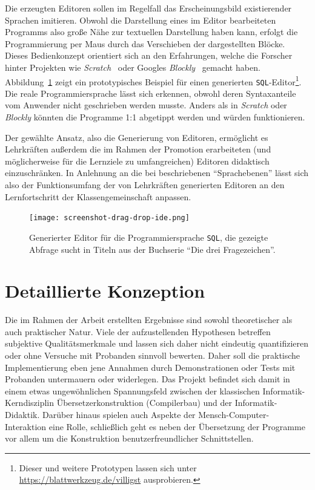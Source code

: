 \documentclass[paper=a4,fontsize=11pt,parskip=half]{scrartcl}
\begin{document}
Die erzeugten Editoren sollen im Regelfall das Erscheinungsbild existierender Sprachen imitieren. Obwohl die Darstellung eines im Editor bearbeiteten Programms also große Nähe zur textuellen Darstellung haben kann, erfolgt die Programmierung per Maus durch das Verschieben der dargestellten Blöcke. Dieses Bedienkonzept orientiert sich an den Erfahrungen, welche die Forscher hinter Projekten wie \textit{Scratch}~\cite{maloney_scratch:_2004} oder Googles \textit{Blockly}~\cite{fraser_ten_2015} gemacht haben. Abbildung~\ref{fig:example-sql-ide} zeigt ein prototypisches Beispiel für einen generierten \texttt{SQL}-Editor\footnote{Dieser und weitere Prototypen lassen sich unter \url{https://blattwerkzeug.de/villigst} ausprobieren.}. Die reale Programmiersprache lässt sich erkennen, obwohl deren Syntaxanteile vom Anwender nicht geschrieben werden musste. Anders als in \textit{Scratch} oder \textit{Blockly} könnten die Programme 1:1 abgetippt werden und würden funktionieren.

Der gewählte Ansatz, also die Generierung von Editoren, ermöglicht es Lehrkräften außerdem die im Rahmen der Promotion erarbeiteten (und möglicherweise für die Lernziele zu umfangreichen) Editoren didaktisch einzuschränken. In Anlehnung an die bei \cite{klaeren_macht_2007} beschriebenen \enquote{Sprachebenen} lässt sich also der Funktionsumfang der von Lehrkräften generierten Editoren an den Lernfortschritt der Klassengemeinschaft anpassen.

\begin{figure}[h]
  \centering\texttt{[image: screenshot-drag-drop-ide.png]}
  \caption{Generierter Editor für die Programmiersprache \texttt{SQL}, die gezeigte Abfrage sucht in Titeln aus der Buchserie \enquote{Die drei Fragezeichen}.}
  \label{fig:example-sql-ide}
\end{figure}

\clearpage

\restoregeometry
\pagestyle{plain}

\section{Detaillierte Konzeption}

Die im Rahmen der Arbeit erstellten Ergebnisse sind sowohl theoretischer als auch praktischer Natur. Viele der aufzustellenden Hypothesen betreffen subjektive Qualitätsmerkmale und lassen sich daher nicht eindeutig quantifizieren oder ohne Versuche mit Probanden sinnvoll bewerten. Daher soll die praktische Implementierung eben jene Annahmen durch Demonstrationen oder Tests mit Probanden untermauern oder widerlegen. Das Projekt befindet sich damit in einem etwas ungewöhnlichen Spannungsfeld zwischen der klassischen Informatik-Kerndisziplin Übersetzerkonstruktion (Compilerbau) und der Informatik-Didaktik. Darüber hinaus spielen auch Aspekte der Mensch-Computer-Interaktion eine Rolle, schließlich geht es neben der Übersetzung der Programme vor allem um die Konstruktion benutzerfreundlicher Schnittstellen.
\end{document}

